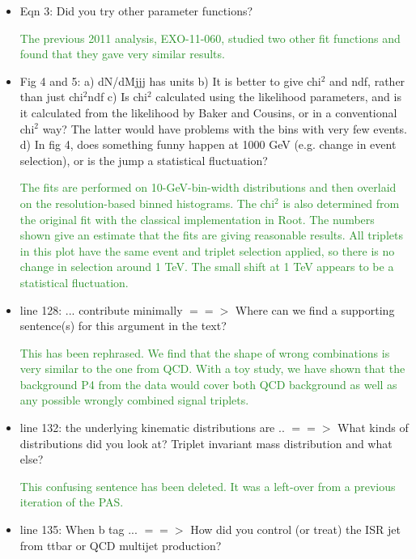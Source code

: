 \documentclass[paper=a4, fontsize=11pt]{scrartcl}
\begin{document}
\begin{itemize}
\item Eqn 3: Did you try other parameter functions?

\textcolor{ForestGreen}{The previous 2011 analysis, EXO-11-060, studied two other
fit functions and found that they gave very similar results.}\\

\item Fig 4 and 5: a) dN/dMjjj has units b) It is better to give chi$^2$ and ndf, rather than just chi$^2$\/ndf c) Is chi$^2$ calculated using the likelihood parameters, and is it calculated from the likelihood by Baker and Cousins, or in a conventional chi$^2$ way? The latter would have problems with the bins with very few events. d) In fig 4, does something funny happen at 1000 GeV (e.g. change in event selection), or is the jump a statistical fluctuation?

\textcolor{ForestGreen}{The fits are performed on 10-GeV-bin-width distributions and then overlaid on the resolution-based
binned histograms. The chi$^2$ is also determined from the original fit with the classical implementation in Root. The numbers shown
give an estimate that the fits are giving reasonable results. All triplets in this plot have the same event and triplet selection applied, so there is no change in selection around 1 TeV. The small shift at 1 TeV appears to be a statistical fluctuation.}\\

\item line 128: ... contribute minimally $==>$ Where can we find a supporting sentence(s) for this argument in the text?

\textcolor{ForestGreen}{This has been rephrased. We find that the shape of wrong combinations is very similar
to the one from QCD. With a toy study, we have shown that the background P4 from the data would cover both QCD background
as well as any possible wrongly combined signal triplets.}\\

\item line 132: the underlying kinematic distributions are .. $==>$ What kinds of distributions did you look at? Triplet invariant mass distribution and what else?

\textcolor{ForestGreen}{This confusing sentence has been deleted. It was a left-over from a previous iteration of the PAS.}\\

\item line 135: When b tag ... $==>$ How did you control (or treat) the ISR jet from ttbar or QCD multijet production?


\end{itemize}
\end{document}
